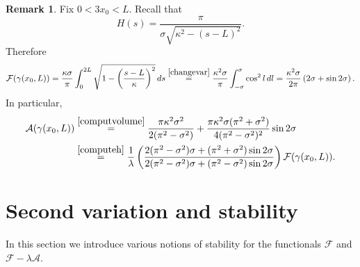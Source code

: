 \documentclass[11pt]{amsart}
\newcommand{\A}{\mathcal A}
\newcommand{\F}{\mathcal F}
\renewcommand{\k}{\kappa}
\theoremstyle{definition}
\newtheorem{remark}[theorem]{Remark}
\theoremstyle{remark}
\numberwithin{equation}{section}
\begin{document}
\begin{remark}\label{rem_funzionalisupunticritici}
Fix $0<3x_0<L$.
Recall that
\begin{equation*}
	H(s)=\frac{\pi}{\sigma\sqrt{\k^2-(s-L)^2}}.
\end{equation*}
Therefore
\begin{equation}\label{computeh}
	\begin{split}
		\F(\gamma(x_0,L))=\frac{ \k\sigma}{\pi}\int_{0}^{2L}\sqrt{1-\left(\frac{s-L}{\k}\right)^2}\,ds\overset{\eqref{changevar}}{=} \frac{\k^2\sigma}{\pi}\int_{-\sigma}^{\sigma}\cos^2 l\,dl 
		=\frac{\k^2\sigma}{2\pi}\left(2\sigma+\sin 2\sigma\right).
	\end{split}
\end{equation}
In particular,
\begin{equation*}
	\begin{split}
		\A(\gamma(x_0,L))&\overset{\eqref{computvolume}}{=}
		\frac{ \pi \k^2\sigma^2}{2(\pi^2-\sigma^2)}+\frac{\pi \k^2\sigma(\pi^2+\sigma^2)}{4(\pi^2-\sigma^2)^2}\sin2\sigma\\
		& \overset{\eqref{computeh}}{=}\frac{1}{\lambda}\left(\frac{2(\pi^2-\sigma^2)\sigma+(\pi^2+\sigma^2)\sin 2\sigma}{2(\pi^2-\sigma^2)\sigma+(\pi^2-\sigma^2)\sin 2\sigma}\right)\F(\gamma(x_0,L)).
	\end{split}
\end{equation*}
\end{remark}
\section{Second variation and stability}\label{sec_sectionstab}
In this section we introduce various notions of stability for the functionals $\F$ and $\F-\lambda\A$.  
\end{document}
